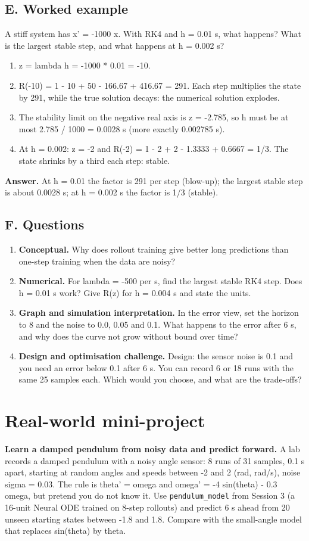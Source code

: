 \documentclass[11pt,a4paper]{article}
\begin{document}
\subsection*{E. Worked example}
A stiff system has x' = -1000 x. With RK4 and h = 0.01 s, what happens? What is the largest stable step, and what happens at h = 0.002 s?
\begin{enumerate}[nosep]
\item z = lambda h = -1000 * 0.01 = -10.
\item R(-10) = 1 - 10 + 50 - 166.67 + 416.67 = 291. Each step multiplies the state by 291, while the true solution decays: the numerical solution explodes.
\item The stability limit on the negative real axis is z = -2.785, so h must be at most 2.785 / 1000 = 0.0028 s (more exactly 0.002785 s).
\item At h = 0.002: z = -2 and R(-2) = 1 - 2 + 2 - 1.3333 + 0.6667 = 1/3. The state shrinks by a third each step: stable.
\end{enumerate}
\textbf{Answer.} At h = 0.01 the factor is 291 per step (blow-up); the largest stable step is about 0.0028 s; at h = 0.002 s the factor is 1/3 (stable).

\subsection*{F. Questions}
\begin{enumerate}[nosep]
\item \textbf{Conceptual.} Why does rollout training give better long predictions than one-step training when the data are noisy?
\item \textbf{Numerical.} For lambda = -500 per s, find the largest stable RK4 step. Does h = 0.01 s work? Give R(z) for h = 0.004 s and state the units.
\item \textbf{Graph and simulation interpretation.} In the error view, set the horizon to 8 and the noise to 0.0, 0.05 and 0.1. What happens to the error after 6 s, and why does the curve not grow without bound over time?
\item \textbf{Design and optimisation challenge.} Design: the sensor noise is 0.1 and you need an error below 0.1 after 6 s. You can record 6 or 18 runs with the same 25 samples each. Which would you choose, and what are the trade-offs?
\end{enumerate}

\section{Real-world mini-project}
\textbf{Learn a damped pendulum from noisy data and predict forward.} A lab records a damped pendulum with a noisy angle sensor: 8 runs of 31 samples, 0.1 s apart, starting at random angles and speeds between -2 and 2 (rad, rad/s), noise sigma = 0.03. The rule is theta' = omega and omega' = -4 sin(theta) - 0.3 omega, but pretend you do not know it. Use \texttt{pendulum\_model} from Session 3 (a 16-unit Neural ODE trained on 8-step rollouts) and predict 6 s ahead from 20 unseen starting states between -1.8 and 1.8. Compare with the small-angle model that replaces sin(theta) by theta.
\end{document}
